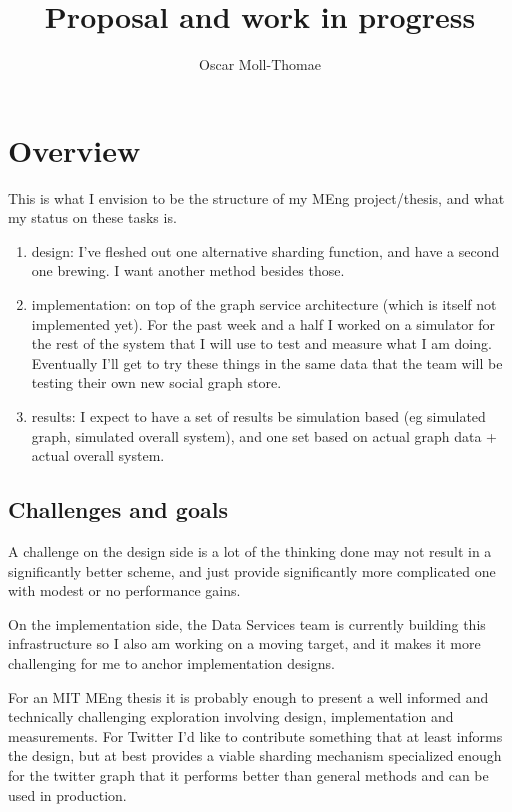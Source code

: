 \documentclass[draft]{article}
\author{Oscar Moll-Thomae}
\title{Proposal and work in progress}
\begin{document}
\maketitle

\section{Overview}
This is what I envision to be the structure of my MEng project/thesis, and what my status on these tasks is.

\begin{enumerate}
\item design: I've fleshed out one alternative sharding function, and have a second one brewing. I want another method besides those. 

\item implementation: on top of the graph service architecture (which is itself not implemented yet). For the past week and a half I  worked on a simulator
for the rest of the system that I will use to test and measure what I am doing. Eventually I'll get to try these things in the same data that the team will be testing their own new social graph store.

\item results: I expect to have a set of results be simulation based (eg simulated graph, simulated overall system),  and one set based on actual graph data + actual overall system.
\end{enumerate}
\subsection{Challenges and goals}
A challenge on the design side is a lot of the thinking done may not result in a significantly better scheme, and just provide significantly more complicated one with modest or no performance gains. 

On the implementation side, the Data Services team is currently building this infrastructure so I also am working on a moving target, and it makes it more challenging for me to anchor implementation designs.

For an MIT MEng thesis it is probably enough to present a well informed and technically challenging exploration involving design, implementation and measurements. For Twitter I'd like to contribute something that at least informs the design, but at best provides a viable sharding mechanism specialized enough for the twitter graph that it performs better than general methods and can be used in production.
\end{document}
